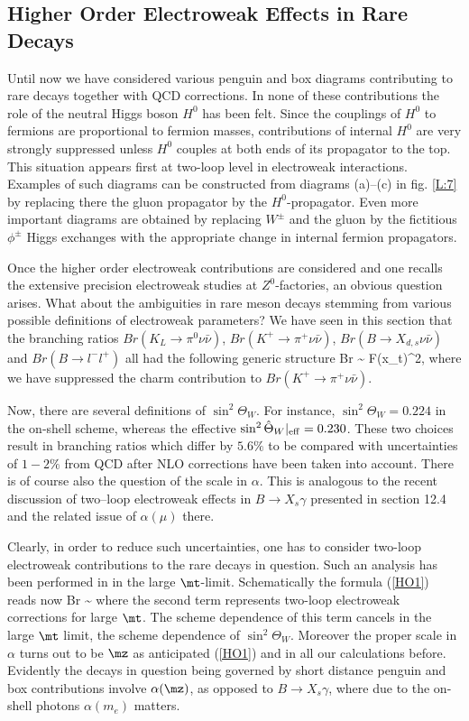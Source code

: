 \subsection{Higher Order Electroweak Effects in Rare Decays}
Until now we have considered various penguin and box diagrams
contributing to rare decays together with QCD corrections.
In none of these contributions the role of the neutral Higgs boson 
$H^0$ has been felt. Since the couplings of $H^0$ to fermions
are proportional to fermion masses, contributions of internal
$H^0$ are very strongly suppressed unless $H^0$ couples at both
ends of its propagator to the top. This situation appears first
at two-loop level in electroweak interactions. 
Examples of such diagrams can be constructed from diagrams
(a)--(c) in fig. \ref{L:7} by replacing there the gluon propagator
by the $H^0$-propagator. Even more important diagrams are obtained
by replacing $W^\pm$ and the gluon by the fictitious $\phi^\pm$
Higgs exchanges with the appropriate change in internal fermion
propagators.

Once the higher order electroweak contributions are considered and
one  recalls the extensive precision electroweak studies at 
$Z^0$-factories, an obvious question arises. What about the
ambiguities in rare meson decays stemming from various possible 
definitions of electroweak parameters? We have seen in this section
that the branching ratios $Br(K_L\to\pi^0\nu\bar\nu)$,
$Br(K^+\to\pi^+\nu\bar\nu)$, $Br(B\to X_{d,s}\nu\bar\nu)$ and
$Br(B\to l^-l^+)$ all had the following generic structure
\be\label{HO1}
Br \sim {}
\lbrack F(x_t)\rbrack^2,
\ee
where we have suppressed the charm contribution to 
$Br(K^+\to\pi^+\nu\bar\nu)$.

Now, there are several definitions of $\sin^2\Theta_W$. For
instance, $\sin^2\Theta_W=0.224$ in the on-shell scheme,
whereas the effective $\sin^2\hat\Theta_W|_{\rm eff}=0.230$.
These two choices result in branching ratios which differ by
$5.6\%$ to be compared with uncertainties of $1-2\%$ from
QCD after NLO corrections have been taken into account.
There is of course also the question of the scale in $\alpha$.
This is analogous to the recent discussion of two--loop
electroweak effects in $B\to X_s\gamma$ presented in section
12.4 and the related issue of $\alpha(\mu)$ there.

Clearly, in order to reduce such uncertainties,
one has to consider two-loop electroweak contributions
to the rare decays in question. Such an analysis has been performed
in \cite{BB97} in the large $\mt$-limit. Schematically the formula
(\ref{HO1}) reads now
\be\label{HO2}
Br \sim {}
\ee
where the second term represents  two-loop electroweak corrections
for large $\mt$. The scheme dependence of this term cancels in the 
large $\mt$ limit, the scheme dependence of $\sin^2\Theta_W$. 
Moreover the proper scale in $\alpha$ turns out to be $\mz$ as
anticipated (\ref{HO1}) and in all our calculations before.
Evidently the decays in question being governed by short distance
penguin and box contributions involve $\alpha(\mz)$, as opposed
to $B\to X_s\gamma$, where due to the on-shell photons $\alpha(m_e)$
matters.

